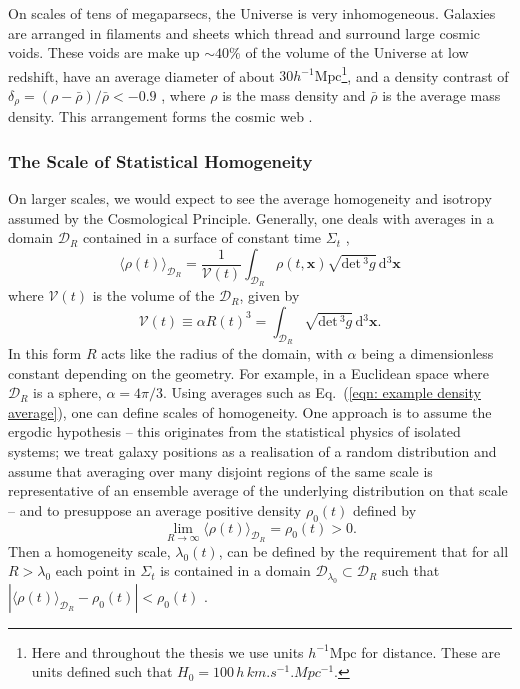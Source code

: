 \documentclass[a4paper,12pt]{report}
\newcommand{\diff}[1]{\,\text{d}{#1}}
\renewcommand{\vec}[1]{\ensuremath{\bm{#1}}}
\renewcommand{\eqref}[1]{Eq.~({#1})}
\begin{document}
On scales of tens of megaparsecs, the Universe is very inhomogeneous. Galaxies are arranged in filaments and sheets which thread and surround large cosmic voids. These voids are make up $\sim 40\%$ of the volume of the Universe at low redshift, have an average diameter of about $30 h^{-1} \mathrm{Mpc}$\footnote{Here and throughout the thesis we use units $h^{-1} \text{Mpc}$ for distance. These are units defined such that $H_0 = 100\, h\, \si{km.s^{-1}.Mpc^{-1}}$.}, and a density contrast of $\delta_\rho = (\rho-\bar{\rho})/\bar{\rho} < -0.9$ \cite{RN149,RN150}, where $\rho$ is the mass density and $\bar{\rho}$ is the average mass density. This arrangement forms the cosmic web \cite{RN55,RN56,RN59}.

\subsubsection{The Scale of Statistical Homogeneity}
\newcommand{\domtoavg}{{\mathcal{D}_R}}
\newcommand{\domtoavgcust}[1]{{\mathcal{D}_{#1}}}
\newcommand{\avgdensity}{\langle \rho(t) \rangle_{\domtoavg}}
On larger scales, we would expect to see the average homogeneity and isotropy assumed by the Cosmological Principle. Generally, one deals with averages in a domain $\domtoavg$ contained in a surface of constant time $\Sigma_t$ \cite{RN147},
\begin{equation}\label{eqn: example density average}
    \langle \rho(t) \rangle_{\domtoavg} = \frac{1}{\mathcal{V}(t)}\int_\domtoavg \rho(t,\vec{x}) \sqrt{\text{det}\,^3g} \diff{^3 \vec{x}}
\end{equation}
where $\mathcal{V}(t)$ is the volume of the $\domtoavg$, given by
\begin{equation}
    \mathcal{V}(t) \equiv \alpha R(t)^3 = \int_\domtoavg \sqrt{\text{det}\,^3g} \diff{^3 \vec{x}}.
\end{equation}
In this form $R$ acts like the radius of the domain, with $\alpha$ being a dimensionless constant depending on the geometry. For example, in a Euclidean space where $\domtoavg$ is a sphere, $\alpha = 4\pi/3$. Using averages such as \eqref{\ref{eqn: example density average}}, one can define scales of homogeneity. One approach is to assume the ergodic hypothesis -- this originates from the statistical physics of isolated systems; we treat galaxy positions as a realisation of a random distribution and assume that averaging over many disjoint regions of the same scale is representative of an ensemble average of the underlying distribution on that scale \cite{RN177} -- and to presuppose an average positive density $\rho_0(t)$ defined by
\begin{equation}
    \lim_{R\to\infty} \avgdensity = \rho_0(t) > 0.
\end{equation}
Then a homogeneity scale, $\lambda_0(t)$, can be defined \cite{RN257} by the requirement that for all $R > \lambda_0$ each point in $\Sigma_t$ is contained in a domain $\domtoavgcust{\lambda_0} \subset \domtoavg$ such that $\left|\avgdensity-\rho_0(t)\right| < \rho_0(t)$ \cite{RN201}.
\end{document}
